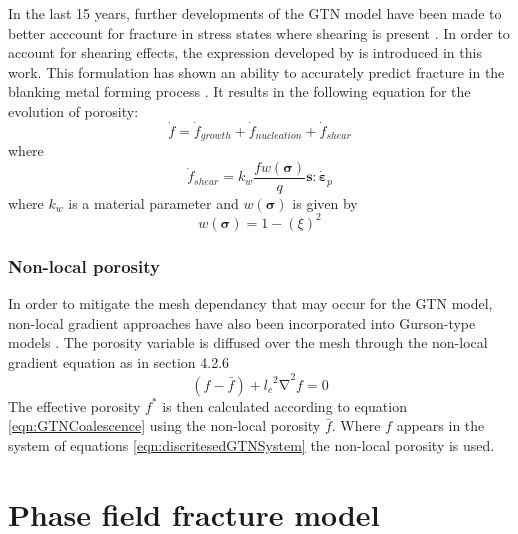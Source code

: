 \documentclass[sn-mathphys,Numbered,draft]{sn-jnl}%
\begin{document}
In the last 15 years, further developments of the GTN model have been made to better acccount for fracture in stress states where shearing is present \cite{nahshon_modification_2008,malcher_continuum_2012,leclerc_micromechanics-based_2020,achouri_numerical_2013}.
In order to account for shearing effects, the expression developed by \citet{nahshon_modification_2008} is introduced in this work. This formulation has shown an ability to accurately predict fracture in the blanking metal forming process \cite{achouri_numerical_2013}. It results in the following equation for the evolution of porosity:
\begin{equation}
	\dot{f}={\dot{f}}_{growth}+{\dot{f}}_{nucleation}+{\dot{f}}_{shear}	
\end{equation}
where
\begin{equation}
	{\dot{f}}_{shear}=k_w\frac{fw\left(\boldsymbol{\sigma}\right)}{q}\mathbf{s}:{\dot{\boldsymbol{\varepsilon}}}_p	
\end{equation}
where $k_w$ is a material parameter and $w(\boldsymbol{\sigma})$ is given by
\begin{equation}
	w\left(\boldsymbol{\sigma}\right)=1-\left(\xi\right)^2	
\end{equation}


\subsubsection{Non-local porosity}

In order to mitigate the mesh dependancy that may occur for the GTN model, non-local gradient approaches have also been incorporated into Gurson-type models \cite{reusch_non-local_2003,leclerc_micromechanics-based_2020}.
The porosity variable is diffused over the mesh through the non-local gradient equation as in section 4.2.6 
\begin{equation}
	\left(f-\bar{f}\right)+{{l_c}^2\mathrm{\nabla}}^2f=0
\end{equation}
  The effective porosity $f^\ast$ is then calculated according to equation \ref{eqn:GTNCoalescence} using the non-local porosity $\bar{f}$. Where $f$ appears in the system of equations \ref{eqn:discritesedGTNSystem} the non-local porosity is used.
 
\section{Phase field fracture model}
\end{document}
